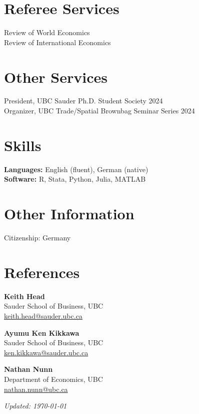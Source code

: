 \documentclass[11pt]{article}
\begin{document}
\section*{Referee Services}
Review of World Economics\\
Review of International Economics \\


\section*{Other Services}
President, UBC Sauder Ph.D. Student Society \hfill 2024 \\
Organizer, UBC Trade/Spatial Brownbag Seminar Series \hfill 2024 \\

\section*{Skills}
\textbf{Languages:} English (fluent), German (native) \\
\textbf{Software:} R, Stata, Python, Julia, MATLAB


\section*{Other Information}
Citizenship: Germany


\section*{References}

\begin{minipage}[t]{0.48\textwidth}
\textbf{Keith Head} \\
Sauder School of Business, UBC \\
\href{mailto:keith.head@sauder.ubc.ca}{keith.head@sauder.ubc.ca}
\end{minipage}
\hfill
\begin{minipage}[t]{0.48\textwidth}
\textbf{Ayumu Ken Kikkawa} \\
Sauder School of Business, UBC \\
\href{mailto:ken.kikkawa@sauder.ubc.ca}{ken.kikkawa@sauder.ubc.ca}
\end{minipage}

\vspace{2em}

\noindent
\begin{minipage}[t]{0.48\textwidth}
\textbf{Nathan Nunn} \\
Department of Economics, UBC \\
\href{mailto:nathan.nunn@ubc.ca}{nathan.nunn@ubc.ca}
\end{minipage}
\hfill
\begin{minipage}[t]{0.48\textwidth}
\end{minipage}



\begin{flushright}
	\textit{Updated: \today}
\end{flushright}
\end{document}
